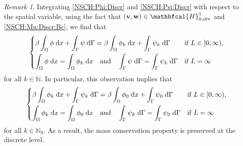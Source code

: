 \documentclass[11pt,reqno]{amsart}
\theoremstyle{remark}
\newtheorem{remark}[theorem]{Remark}
\numberwithin{equation}{section}
\newcommand{\N}{\mathbb N}
\newcommand{\intO}{\int_\Omega}
\newcommand{\intG}{\int_\Gamma}
\newcommand{\dx}{\;\mathrm{d}x}
\newcommand{\dG}{\;\mathrm d\Ga}
\newcommand{\Div}{\textnormal{div}}
\newcommand{\Ga}{\Gamma}
\newcommand{\bv}{\mathbf v}
\newcommand{\bw}{\mathbf w}
\begin{document}
\begin{remark}
    Integrating \eqref{NSCH:Phi:Discr} and \eqref{NSCH:Psi:Discr} with respect to the spatial variable, using the fact that $(\bv,\bw)\in\mathbfcal{H}^1_{0,\Div}$ and \eqref{NSCH:Mu:Discr:Bc}, we find that
    \begin{align*}
        \begin{dcases}
            \beta\intO \phi\dx + \intG \psi\dG = \beta\intO \phi_k \dx + \intG \psi_k\dG &\textnormal{if } L\in[0,\infty), \\
            \intO\phi\dx = \intO\phi_k\dx \quad\textnormal{and}\quad \intG\psi\dG = \intG\psi_k\dG &\textnormal{if } L = \infty
        \end{dcases}
    \end{align*}
    for all $k\in\N$. In particular, this observation implies that
    \begin{align*}
        \begin{dcases}
            \beta\intO \phi_k\dx + \intG \psi_k\dG = \beta\intO \phi_0 \dx + \intG \psi_0\dG &\textnormal{if~} L\in[0,\infty), \\
            \intO\phi_k\dx = \intO\phi_0\dx \quad\textnormal{and}\quad \intG\psi_k\dG = \intG\psi_0\dG &\textnormal{if~} L = \infty
        \end{dcases}
    \end{align*}
    for all $k\in\N_0$. As a result, the mass conservation property is preserved at the discrete level.
\end{remark}
\end{document}

